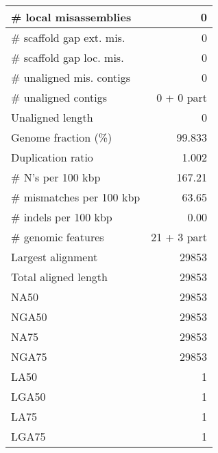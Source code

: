\documentclass[12pt,a4paper]{article}
\begin{document}
\begin{table}[ht]
\begin{center}
\begin{tabular}{|l*{1}{|r}|}
\# local misassemblies & 0 \\ \hline
\# scaffold gap ext. mis. & 0 \\ \hline
\# scaffold gap loc. mis. & 0 \\ \hline
\# unaligned mis. contigs & 0 \\ \hline
\# unaligned contigs & 0 + 0 part \\ \hline
Unaligned length & 0 \\ \hline
Genome fraction (\%) & 99.833 \\ \hline
Duplication ratio & 1.002 \\ \hline
\# N's per 100 kbp & 167.21 \\ \hline
\# mismatches per 100 kbp & 63.65 \\ \hline
\# indels per 100 kbp & 0.00 \\ \hline
\# genomic features & 21 + 3 part \\ \hline
Largest alignment & 29853 \\ \hline
Total aligned length & 29853 \\ \hline
NA50 & 29853 \\ \hline
NGA50 & 29853 \\ \hline
NA75 & 29853 \\ \hline
NGA75 & 29853 \\ \hline
LA50 & 1 \\ \hline
LGA50 & 1 \\ \hline
LA75 & 1 \\ \hline
LGA75 & 1 \\ \hline
\end{tabular}
\end{center}
\end{table}
\end{document}
